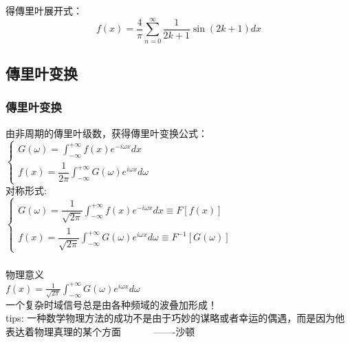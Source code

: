\begin{frame}
	得傳里叶展开式：
	\begin{equation*}
		f(x) = \frac{4}{\pi} \sum_{n=0}^{\infty}  \frac{1}{2k+1} \sin(2k+1) dx  
	\end{equation*}       
\end{frame}

\subsection{傳里叶变换 }

\begin{frame}
\frametitle{傳里叶变换 }
	由非周期的傳里叶级数，获得傳里叶变换公式：\\
	$\displaystyle \begin{cases}
		G(\omega) =\int_{-\infty}^{+\infty}  f(x) e^{-i\omega x} dx \\
		f(x) =\dfrac{1}{2\pi} \int_{-\infty}^{+\infty}  G(\omega) e^{i\omega x} d\omega
	\end{cases}$ \\ \vspace{0.3cm}
	{对称形式:}\\ 
	$\displaystyle \begin{cases}
		G(\omega) =\dfrac{1}{\sqrt{2\pi}} \int_{-\infty}^{+\infty}  f(x) e^{-i\omega x} dx  \equiv F[f(x)]\\
		f(x) =\dfrac{1}{\sqrt{2\pi}}  \int_{-\infty}^{+\infty}  G(\omega) e^{i\omega x} d\omega  \equiv F^{-1}[G(\omega)]
	\end{cases}$ \\	
\end{frame}

\begin{frame}
	\frametitle{}
	{\large   物理意义  }\\ 	\vspace{0.3cm}
	{\Large   $\displaystyle f(x) =\frac{1}{\sqrt{2\pi}}  \int_{-\infty}^{+\infty}  G(\omega) e^{i\omega x} d\omega $ }\\	\vspace{0.3cm}
    一个复杂时域信号总是由各种频域的波叠加形成！	\\ \vspace{0.3cm}
	tips: 一种数学物理方法的成功不是由于巧妙的谋略或者幸运的偶遇，而是因为他表达着物理真理的某个方面 ~~~~~~-------沙顿
\end{frame}

